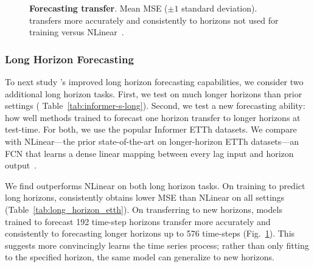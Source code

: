 \begin{figure}[!t]
\begin{minipage}[c]{0.45\textwidth}
  \caption{ \textbf{Forecasting transfer}. Mean MSE ($\pm 1$ standard deviation). \ourmethod{} 
  transfers more accurately and consistently to horizons not used for training versus NLinear~\cite{zeng2022transformers}.}
  \label{fig:transfer_forecast_etth} 
\end{minipage}
\end{figure}

\subsubsection{Long Horizon Forecasting} 
\label{sec:empirical_horizons}
To next study \ourmethod{}'s improved long horizon forecasting capabilities, we consider two additional long horizon tasks. 
%
First, we test on much longer horizons than prior settings (\cf{} Table~\ref{tab:informer-s-long}). Second, we test a new forecasting ability: how well methods trained to forecast one horizon transfer to longer horizons at test-time.  
%
For both, we use the popular Informer ETTh datasets. We compare \ourmethod{} with NLinear---the prior state-of-the-art on longer-horizon ETTh datasets---an FCN that learns a dense linear mapping between every lag input and horizon output~\citep{zeng2022transformers}.

We find \ourmethod{} outperforms NLinear on both long horizon tasks. On training to predict long horizons, \ourmethod{} consistently obtains lower MSE than NLinear on all settings (Table~\ref{tab:long_horizon_etth}). 
On transferring to new horizons, \ourmethod{} models trained to forecast 192 time-step horizons transfer more accurately and consistently to forecasting longer horizons up to 576 time-steps (Fig.~\ref{fig:transfer_forecast_etth}).
This suggests \ourmethod{} more convincingly learns the time series process; rather than only fitting to the specified horizon, the same model can generalize to new horizons.


%
%
%


